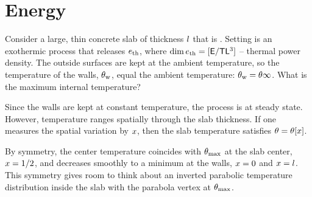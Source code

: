 %
\newcommand{\atemp}{\temp\infty}    %
\newcommand{\wtemp}{\temp\txt{w}}   %
\newcommand{\mtemp}{\temp\txt{max}} %

\section{Energy}
Consider a large, thin concrete slab of thickness $l$ that is . Setting is an exothermic process that releases $e_\text{th}$, where $\dim e_\text{th} = [\mathsf{E}/\mathsf{T}\mathsf{L}^3]$ -- thermal power density. The outside surfaces are kept at the ambient temperature, so the temperature of the walls, $\wtemp$, equal the ambient temperature: $\wtemp = \atemp$. What is the maximum internal temperature?


\begin{guess}
Since the walls are kept at constant temperature, the process is at steady state. However, temperature ranges spatially through the slab thickness. If one measures the spatial variation by $x$, then the slab temperature satisfies $\theta = \theta\!\left[{x}\right]$.

By symmetry, the center temperature coincides with $\mtemp$ at the slab center, $x = 1/2$, and decreases smoothly to a minimum at the walls, $x = 0$ and $x = l$. This symmetry gives room to think about an inverted parabolic temperature distribution inside the slab with the parabola vertex at $\mtemp$.
\end{guess}


